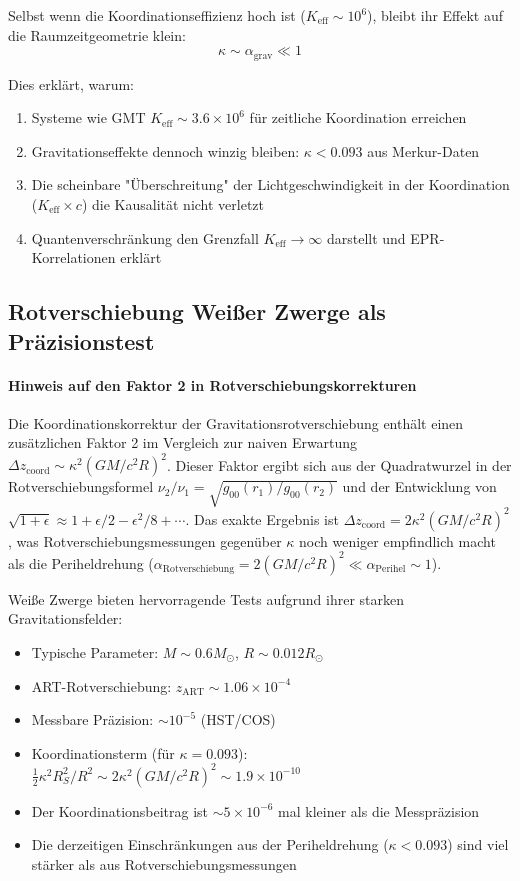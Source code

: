 \documentclass[11pt,a4paper]{article}
\begin{document}
	Selbst wenn die Koordinationseffizienz hoch ist ($K_{\mathrm{eff}} \sim 10^6$), bleibt ihr Effekt auf die Raumzeitgeometrie klein:
	\[
	\kappa \sim \alpha_{\text{grav}} \ll 1
	\]
	
	Dies erklärt, warum:
	\begin{enumerate}
		\item Systeme wie GMT $K_{\mathrm{eff}} \sim 3.6\times10^6$ für zeitliche Koordination erreichen
		\item Gravitationseffekte dennoch winzig bleiben: $\kappa < 0.093$ aus Merkur-Daten
		\item Die scheinbare "Überschreitung" der Lichtgeschwindigkeit in der Koordination ($K_{\mathrm{eff}} \times c$) die Kausalität nicht verletzt
		\item Quantenverschränkung den Grenzfall $K_{\mathrm{eff}} \to \infty$ darstellt und EPR-Korrelationen erklärt
	\end{enumerate}	
	\subsection{Rotverschiebung Weißer Zwerge als Präzisionstest}
	\paragraph{Hinweis auf den Faktor 2 in Rotverschiebungskorrekturen}
	Die Koordinationskorrektur der Gravitationsrotverschiebung enthält einen zusätzlichen Faktor 2 im Vergleich zur naiven Erwartung $\Delta z_{\text{coord}} \sim \kappa^2 (GM/c^2R)^2$. Dieser Faktor ergibt sich aus der Quadratwurzel in der Rotverschiebungsformel $\nu_2/\nu_1 = \sqrt{g_{00}(r_1)/g_{00}(r_2)}$ und der Entwicklung von $\sqrt{1 + \epsilon} \approx 1 + \epsilon/2 - \epsilon^2/8 + \cdots$. Das exakte Ergebnis ist $\Delta z_{\text{coord}} = 2\kappa^2 (GM/c^2R)^2$, was Rotverschiebungsmessungen gegenüber $\kappa$ noch weniger empfindlich macht als die Periheldrehung ($\alpha_{\text{Rotverschiebung}} = 2(GM/c^2R)^2 \ll \alpha_{\text{Perihel}} \sim 1$).
	
	Weiße Zwerge bieten hervorragende Tests aufgrund ihrer starken Gravitationsfelder:
	\begin{itemize}
		\item Typische Parameter: $M \sim 0.6 M_\odot$, $R \sim 0.012 R_\odot$
		\item ART-Rotverschiebung: $z_{\text{ART}} \sim 1.06\times10^{-4}$
		\item Messbare Präzision: $\sim 10^{-5}$ (HST/COS)
		\item Koordinationsterm (für $\kappa = 0.093$): $\frac{1}{2}\kappa^2 R_S^2/R^2 \sim 2\kappa^2 (GM/c^2R)^2 \sim 1.9\times10^{-10}$
		\item Der Koordinationsbeitrag ist $\sim 5\times10^{-6}$ mal kleiner als die Messpräzision
		\item Die derzeitigen Einschränkungen aus der Periheldrehung ($\kappa < 0.093$) sind viel stärker als aus Rotverschiebungsmessungen
	\end{itemize}
\end{document}
